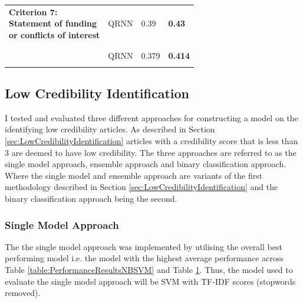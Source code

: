 \documentclass[a4paper,twoside,phd]{BYUPhys}
\begin{document}
\begin{table}[H]
\begin{tabular}{|p{6cm}|p{2cm}|p{3cm}|p{3.3cm}|}
			
			\multirowcell{3}{\textbf{Criterion 7:} \\ \textbf{Statement of funding} \\ \textbf{or conflicts of interest}} 
			& QRNN & 0.39 & \textbf{0.43} \\ 
			& & &\\ & & &\\ 
			\hline 
			
			
			\multirowcell{2}{\textbf{Average} \textbf{Performance}} 
			& QRNN & 0.379 & \textbf{0.414}      \\ 
			& & &      \\
			\hline                                                                                                                                          
	\end{tabular}
	\label{table:PerformanceResultsQRNN}
\end{table}


\subsection{Low Credibility Identification}
\label{sec:LowCredibilityIdentificationResults}

I tested and evaluated three different approaches for constructing a model on the identifying low credibility articles. As described in Section \ref{sec:LowCredibilityIdentification} articles with a credibility score that is less than 3 are deemed to have low credibility. The three approaches are referred to as the single model approach, ensemble approach and binary classification approach. Where the single model and ensemble approach are variants of the first methodology described in Section \ref{sec:LowCredibilityIdentification} and the binary classification approach being the second.\newline

\subsubsection{Single Model Approach}
The the single model approach was implemented by utilising the overall best performing model i.e. the model with the highest average performance across Table \ref{table:PerformanceResultsNBSVM} and Table \ref{table:PerformanceResultsQRNN}. Thus, the model used to evaluate the single model approach will be SVM with TF-IDF scores (stopwords removed). \newline
\end{document}
